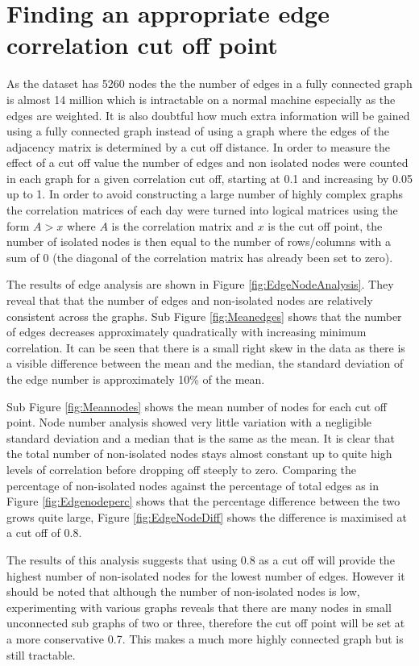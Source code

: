 \section{Finding an appropriate  edge correlation cut off point}
As the dataset has 5260 nodes the the number of edges in a fully connected graph is almost 14 million which is intractable on a normal machine especially as the edges are weighted. It is also doubtful how much extra information will be gained using a fully connected graph instead of using a graph where the edges of the adjacency matrix is determined by a cut off distance. In order to measure the effect of a cut off value the number of edges and non isolated nodes were counted in each graph for a given correlation cut off, starting at 0.1 and increasing by 0.05 up to 1. In order to avoid constructing a large number of highly complex graphs the correlation matrices of each day were turned into logical matrices using the form $A>x$ where $A$ is the correlation matrix and $x$ is the cut off point, the number of isolated nodes is then equal to the number of rows/columns with a sum of 0 (the diagonal of the correlation matrix has already been set to zero).

The results of edge analysis are shown in Figure \ref{fig:EdgeNodeAnalysis}. They reveal that that the number of edges and non-isolated nodes are relatively consistent across the graphs. Sub Figure \ref{fig:Meanedges} shows that the number of edges decreases approximately quadratically with increasing minimum correlation. It can be seen that there is a small right skew in the data as there is a visible difference between the mean and the median, the standard deviation of the edge number is approximately 10\% of the mean. 

Sub Figure \ref{fig:Meannodes} shows the mean number of nodes for each cut off point. Node number analysis showed very little variation with a negligible standard deviation and a median that is the same as the mean. It is clear that the total number of non-isolated nodes stays almost constant up to quite high levels of correlation before dropping off steeply to zero. Comparing the percentage of non-isolated nodes against the percentage of total edges as in Figure \ref{fig:Edgenodeperc} shows that the percentage difference between the two grows quite large, Figure \ref{fig:EdgeNodeDiff} shows the difference is maximised at a cut off of 0.8. 

The results of this analysis suggests that using 0.8 as a cut off will provide the highest number of non-isolated nodes for the lowest number of edges. However it should be noted that although the number of non-isolated nodes is low, experimenting with various graphs reveals that there are many nodes in small unconnected sub graphs of two or three, therefore the cut off point will be set at a more conservative 0.7. This makes a much more highly connected graph but is still tractable. 

